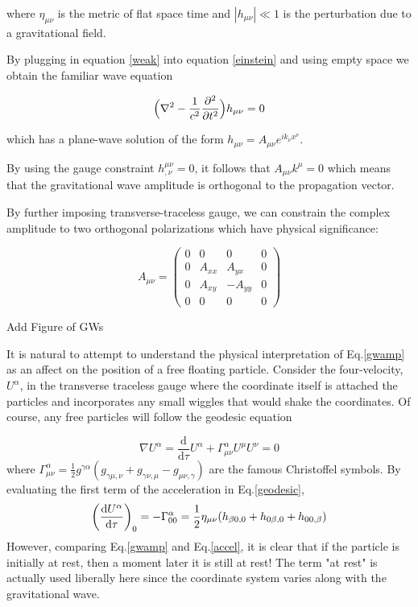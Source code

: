 \documentclass[oneside]{book}
\begin{document}
	where $\eta_{\mu \nu}$ is the metric of flat space time and $|h_{\mu \nu}| \ll 1$ is the perturbation due to a gravitational field.
	
	By plugging in equation \ref{weak} into equation \ref{einstein} and using empty space we obtain the familiar wave equation
	
	\begin{equation} \label{wave}
	\Big(\nabla^2 - \frac{1}{c^2} \pdv[2]{t} \Big) h_{\mu \nu}  = 0
	\end{equation}

	which has a plane-wave solution of the form $h_{\mu \nu} = A_{\mu \nu} e^{ik_{\nu} x^{\nu}}$. 
	
	By using the gauge constraint $h^{\mu \nu}_{,\nu} = 0$, it follows that $A_{\mu \nu} k^{\mu} = 0$ which means that the gravitational wave amplitude is orthogonal to the propagation vector.
	
	By further imposing transverse-traceless gauge, we can constrain the complex amplitude to two orthogonal polarizations which have physical significance:
	
	\begin{equation} \label{gwamp}
	A_{\mu \nu} = 
	\begin{pmatrix}
			0 &    0   &  0      & 0 
		 \\ 0 & A_{xx} &  A_{yx} & 0
		 \\ 0 & A_{xy} & -A_{yy} & 0
		 \\ 0 &    0   &  0      & 0
	\end{pmatrix}
	\end{equation}

	Add Figure of GWs

	It is natural to attempt to understand the physical interpretation of Eq.\ref{gwamp} as an affect on the position of a free floating particle. Consider the four-velocity, $U^{\alpha}$, in the transverse traceless gauge where the coordinate itself is attached the particles and incorporates any small wiggles that would shake the coordinates.  Of course, any free particles will follow the geodesic equation
	
	\begin{equation}\label{geodesic}
	\nabla U^{\alpha} = \frac{\text{d}}{\text{d} \tau} U^{\alpha} + \Gamma^{\alpha}_{\mu \nu} U^{\mu} U^{\nu} = 0
	\end{equation}	
	where $\Gamma^{\alpha}_{\mu \nu} = \frac{1}{2} g^{\gamma \alpha}(g_{\gamma \mu, \nu} + g_{\gamma \nu,\mu} - g_{\mu \nu, \gamma} )$ are the famous Christoffel symbols.
	By evaluating the first term of the acceleration in Eq.\ref{geodesic},
	\begin{equation}\label{accel}
	\bigg(\frac{\text{d}U^{\alpha}}{\text{d}\tau}\bigg)_0 = -\Gamma^{\alpha}_{00} 
	\\ = \frac{1}{2} \eta_{\mu \nu} (h_{\beta 0, 0} + h_{0 \beta, 0} + h_{0 0, \beta} )
	\end{equation}
	However, comparing Eq.\ref{gwamp} and Eq.\ref{accel}, it is clear that if the particle is initially at rest, then a moment later it is still at rest! The term "at rest" is actually used liberally here since the coordinate system varies along with the gravitational wave. 
	
\end{document}
